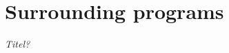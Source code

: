 \documentclass[11pt,british]{article}
\begin{document}


\newpage{}

\section{Surrounding programs}
\emph{\color{red}Titel?}\\
\end{document}
